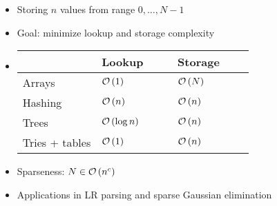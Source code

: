\begin{frame}{}
	\begin{itemize}[<+->]
		\itemspacing{10pt}
		\item Storing $n$ values from range $0, \ldots, N - 1$
		\item Goal: minimize lookup and storage complexity
		\item[]
			\begin{tabular}{l | l | l}
				{}             & Lookup \ \ \ & Storage \ \ \ \\
				\hline
				Arrays         & $\mathcal{O}\left(1\right)$           & $\mathcal{O}\left(N\right)$       \\[1em]
				Hashing        & $\mathcal{O}\left(n\right)$           & $\mathcal{O}\left(n\right)$       \\[1em]
				Trees          & $\mathcal{O}\left(\log n\right)$      & $\mathcal{O}\left(n\right)$       \\[1em]
				Tries + tables & $\mathcal{O}\left(1\right)$           & $\mathcal{O}\left(n\right)$
			\end{tabular}
		\item Sparseness: $N \in \mathcal{O}\left(n^c\right)$
		\item Applications in LR parsing and sparse Gaussian elimination
	\end{itemize}
\end{frame}
